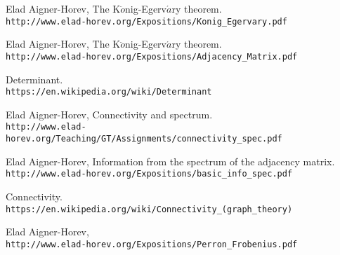 \documentclass[a4paper, 11pt, oneside]{article}
\begin{document}
\begin{thebibliography}{9} 
Elad Aigner-Horev,
The K$\ddot{o}$nig-Egerv$\acute{a}$ry theorem.
\\\texttt{http://www.elad-horev.org/Expositions/Konig\_Egervary.pdf}

Elad Aigner-Horev,
The K$\ddot{o}$nig-Egerv$\acute{a}$ry theorem.
\\\texttt{http://www.elad-horev.org/Expositions/Adjacency\_Matrix.pdf}

Determinant.
\\\texttt{https://en.wikipedia.org/wiki/Determinant}

Elad Aigner-Horev,
Connectivity and spectrum.
\\\texttt{http://www.elad-horev.org/Teaching/GT/Assignments/connectivity\_spec.pdf}

Elad Aigner-Horev,
Information from the spectrum of the adjacency matrix.
\\\texttt{http://www.elad-horev.org/Expositions/basic\_info\_spec.pdf}

Connectivity.
\\\texttt{https://en.wikipedia.org/wiki/Connectivity\_(graph\_theory)}

Elad Aigner-Horev,
\\\texttt{http://www.elad-horev.org/Expositions/Perron\_Frobenius.pdf}

\end{thebibliography}
\end{document}
